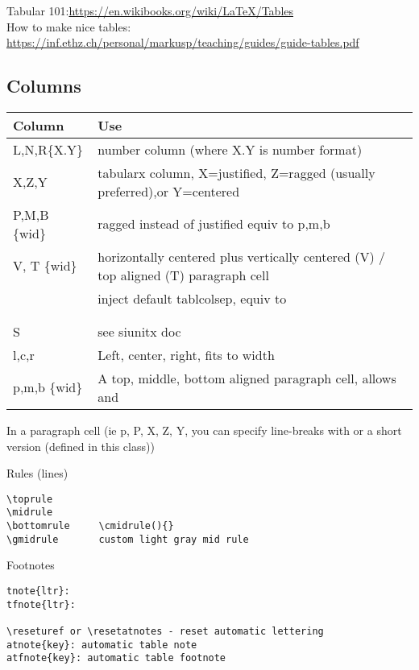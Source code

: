 \documentclass{\FormatDir corpboreportMulti}
\newcommand{\cmd}[1]{\texttt{\detokenize{#1}}}
\begin{document}
Tabular 101:\url{https://en.wikibooks.org/wiki/LaTeX/Tables}\\
How to make nice tables: \url{https://inf.ethz.ch/personal/markusp/teaching/guides/guide-tables.pdf}

\subsection{Columns}

	\begin{tabularx}{\linewidth}{l Z}\toprule
		Column & Use \\\midrule
		L,N,R\{X.Y\} & \cmd{siunitx} number column (where X.Y is number format)\\
		X,Z,Y & tabularx column, X=justified, Z=ragged (usually preferred),\nl or Y=centered\\
		P,M,B \{wid\} & ragged instead of justified equiv to p,m,b\\
	  V, T \{wid\} & horizontally centered plus vertically centered (V) / top aligned (T) paragraph cell\\
		\cmd{~}\phantom{1} & inject default tablcolsep, equiv to \cmd{@{\hspace{\tabcolsep}}}\\
		\\
  	\\
		S & see siunitx doc \\
		l,c,r & Left, center, right, fits to width\\
	  p,m,b \{wid\} & A top, middle, bottom aligned paragraph cell, allows \cmd{\newline and \nl}\\
		\bottomrule
	\end{tabularx}


In a paragraph cell (ie p, P, X, Z, Y, you can specify line-breaks with \cmd{\newline} or a short version \cmd{\nl} (defined in this class))

Rules (lines)
\begin{lstlisting}
\toprule
\midrule
\bottomrule		\cmidrule(){}
\gmidrule		custom light gray mid rule
\end{lstlisting}

Footnotes
\begin{lstlisting}
tnote{ltr}:
tfnote{ltr}:

\reseturef or \resetatnotes - reset automatic lettering
atnote{key}: automatic table note
atfnote{key}: automatic table footnote
\end{lstlisting}
\end{document}
